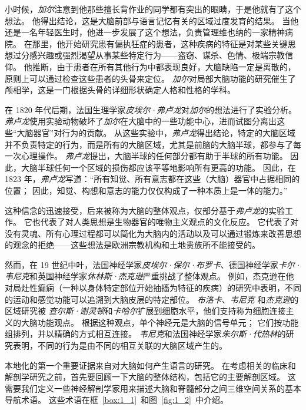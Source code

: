 小时候，\textit{加尔}注意到他那些擅长背作业的同学都有突出的眼睛，于是他就有了这个想法。
他得出结论，这是大脑前部与语言记忆有关的区域过度发育的结果。
当他还是一名年轻医生时，他进一步发展了这个想法，负责管理维也纳的一家精神病院。
在那里，他开始研究患有偏执狂症的患者，这种疾病的特征是对某些关键思想过分感兴趣或强烈渴望从事某些特定行为——盗窃、谋杀、色情、极端宗教信仰。
他推断，由于患者在所有其他行为中都表现良好，大脑缺陷一定是离散的，原则上可以通过检查这些患者的头骨来定位。
\textit{加尔}对局部大脑功能的研究催生了颅相学，这是一门根据头骨的详细形状确定人格和性格的学科。


在 1820 年代后期，法国生理学家\textit{皮埃尔·弗卢龙}对\textit{加尔}的想法进行了实验分析。 
\textit{弗卢龙}使用实验动物破坏了\textit{加尔}在大脑中的一些功能中心，进而试图分离出这些“大脑器官”对行为的贡献。
从这些实验中，\textit{弗卢龙}得出结论，特定的大脑区域并不负责特定的行为，而是所有的大脑区域，尤其是前脑的大脑半球，都参与了每一次心理操作。
\textit{弗卢龙}提出，大脑半球的任何部分都有助于半球的所有功能。
因此，大脑半球任何一个区域的损伤都应该平等地影响所有更高的功能。
因此，在 1823 年，\textit{弗卢龙}写道：“所有知觉、所有意志都在这些（大脑）器官中占据相同的位置；
因此，知觉、构想和意志的能力仅仅构成了一种本质上是一体的能力。”


这种信念的迅速接受，后来被称为大脑的整体观点，仅部分基于\textit{弗卢龙}的实验工作。
它也代表了对人类思想是生物器官的唯物主义观点的文化反应。
它代表了对没有灵魂、所有心理过程都可以简化为大脑内的活动以及可以通过锻炼来改善思想的观念的拒绝——这些想法是欧洲宗教机构和土地贵族所不能接受的。


然而，在 19 世纪中叶，法国神经学家\textit{皮埃尔·保尔·布罗卡}、德国神经学家\textit{卡尔·韦尼克}和英国神经学家\textit{休林斯·杰克逊}严重挑战了整体观点。
例如，杰克逊在他对局灶性癫痫（一种以身体特定部位开始抽搐为特征的疾病）的研究中表明，不同的运动和感觉功能可以追溯到大脑皮层的特定部位。
\textit{布洛卡}、\textit{韦尼克} 和\textit{杰克逊}的区域研究被 \textit{查尔斯·谢灵顿}和\textit{卡哈尔}扩展到细胞水平，他们支持称为细胞连接主义的大脑功能观点。
根据这种观点，单个神经元是大脑的信号单元；
它们按功能组排列，并以精确的方式相互连接。
\textit{韦尼克}和法国神经学家\textit{朱尔斯·代热林}的研究表明，不同的行为是由不同的相互关联的大脑区域产生的。


本地化的第一个重要证据来自对大脑如何产生语言的研究。
在考虑相关的临床和解剖学研究之前，首先要回顾一下大脑的整体结构，包括它的主要解剖区域。
这需要我们定义一些神经解剖学家用来描述大脑和脊髓部分之间三维空间关系的基本导航术语。
这些术语在框~\ref{box:1_1}~和图~\ref{fig:1_2}~中介绍。


